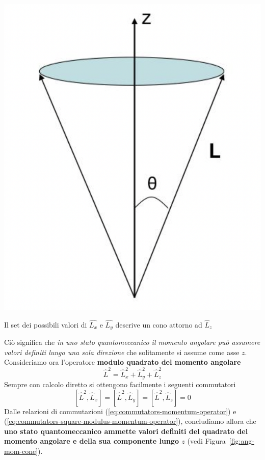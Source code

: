 \begin{marginfigure}
    \includegraphics{figs/ang-mom-cone}
    \caption{Il set dei possibili valori di $\hat{L_x}$ e $\hat{L_y}$ descrive un cono attorno ad $\hat{L}_z$}
    \label{fig:ang-mom-cone}
\end{marginfigure}
Ciò significa che \emph{in uno stato quantomeccanico il
momento angolare può assumere valori definiti lungo una sola direzione}
che solitamente si assume come asse \(z\).
Consideriamo ora l'operatore \textbf{modulo quadrato del momento
angolare}
\begin{equation}
    \hat{L}^{2} = \hat{L}_{x}^{2} + \hat{L}_{y}^{2} + \hat{L}_{z}^{2}
    \label{eq:square-modulus-momentum-operator}
\end{equation} Sempre con calcolo diretto si ottengono facilmente i seguenti
commutatori
\begin{equation}
    \left[ \hat{L}^{2},\hat{L}_{x}\right] = \left[ \hat{L}^{2},\hat{L}_{y}\right] = \left[ \hat{L}^{2},\hat{L}_{z}\right] = 0
    \label{eq:commutators-square-modulus-momentum-operator}
\end{equation}
Dalle relazioni di commutazioni (\ref{eq:commutators-momentum-operator}) e (\ref{eq:commutators-square-modulus-momentum-operator}),
concludiamo allora che
\textbf{uno stato quantomeccanico ammette valori definiti del quadrato
del momento angolare e della sua componente lungo \(z\)} (vedi Figura~\ref{fig:ang-mom-cone}).
\bigskip

